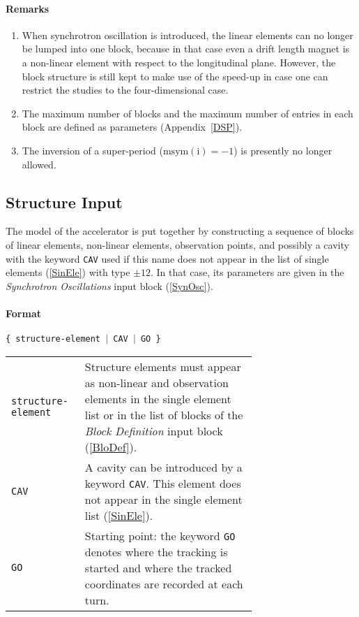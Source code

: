 \paragraph{Remarks}
\begin{enumerate}
    \item When synchrotron oscillation is introduced, the linear elements can no longer be lumped into one block, because in that case even a drift length magnet is a non-linear element with respect to the longitudinal plane. However, the block structure is still kept to make use of the speed-up in case one can restrict the studies to the four-dimensional case.
    \item The maximum number of blocks and the maximum number of entries in each block are defined as parameters (Appendix~\ref{DSP}).
    \item The inversion of a super-period ($\mathrm{msym(i)} = -1$) is presently no longer allowed.
\end{enumerate}

\subsection{Structure Input} \label{StrInp}

The model of the accelerator is put together by constructing a sequence of blocks of linear elements, non-linear elements, observation points, and possibly a cavity with the keyword \texttt{CAV} used if this name does not appear in the list of single elements (\ref{SinEle}) with type $\pm 12$.
In that case, its parameters are given in the \textit{Synchrotron Oscillations} input block (\ref{SynOsc}).

\paragraph{Format} \texttt{\{ structure-element $\vert$ CAV $\vert$ GO \}}

\bigskip
\begin{longtabu}{@{}lp{0.70\linewidth}}
    \texttt{structure-element} & Structure elements must appear as non-linear and observation elements in the single element list or in the list of blocks of the \textit{Block Definition} input block (\ref{BloDef}). \\
    \texttt{CAV} & A cavity can be introduced by a keyword \texttt{CAV}. This element does not appear in the single element list   (\ref{SinEle}). \\
    \texttt{GO} & Starting point: the keyword \texttt{GO} denotes where the tracking is started and where the tracked coordinates are recorded at each turn.
\end{longtabu}

